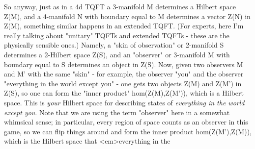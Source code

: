 So anyway, just as in a 4d TQFT a 3-manifold M determines a Hilbert space Z(M),
and a 4-manifold N with boundary equal to M determines a vector Z(N) in 
Z(M), something similar happens in an extended TQFT.  (For experts, here
I'm really talking about "unitary" TQFTs and extended TQFTs - these are
the physically sensible ones.)   Namely, a "skin of observation" or 2-manifold
S determines a 2-Hilbert space Z(S), and an "observer" or 3-manifold M with
boundary equal to S determines an object in Z(S).  Now, given two observers
M and M' with the same "skin" - for example, the observer "you" and the 
observer "everything in the world except you" - one gets two 
objects Z(M) and Z(M') in Z(S), so one can form the "inner product" 
hom(Z(M),Z(M')), which is a Hilbert space.  This is \emph{your} Hilbert 
space for describing states of \emph{everything in the world except you}.
Note that we are using the term "observer" here in a 
somewhat whimsical sense; in particular, every region of space counts as an 
observer in this game, so we can flip things around and form the inner product 
hom(Z(M'),Z(M)), which is the Hilbert space that <em>everything in the 


